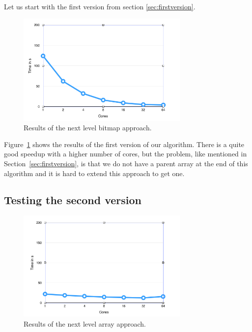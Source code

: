 \documentclass[12pt,a4paper]{article}
\begin{document}
Let us start with the first version from section \ref{sec:firstversion}.

\begin{figure}[!ht]
   \centering
   \includegraphics[width=0.75\textwidth]{next_level}
   \caption{Results of the next level bitmap approach.}
   \label{fig:nextbitmap}
\end{figure}

Figure~\ref{fig:nextbitmap} shows the results of the first version of our algorithm. There is a quite good speedup with a higher number of cores, but the problem, like mentioned in Section~\ref{sec:firstversion}, is that we do not have a parent array at the end of this algorithm and it is hard to extend this approach to get one.

\subsection{Testing the second version}

\begin{figure}[!ht]
   \centering
   \includegraphics[width=0.75\textwidth]{parent_array}
   \caption{Results of the next level array approach.}
   \label{fig:parentarray}
\end{figure}
\end{document}
